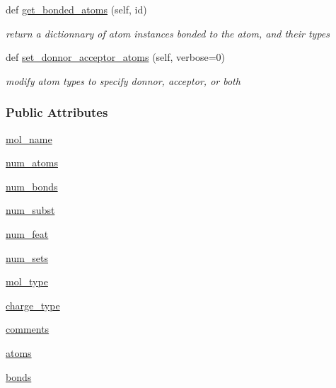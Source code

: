 \begin{DoxyCompactItemize}
def \hyperlink{classsrc_1_1Mol2_1_1mol2_a85de5060effdb6a854a5cad7f511bf30}{get\+\_\+bonded\+\_\+atoms} (self, id)
\begin{DoxyCompactList}\small\item\em return a dictionnary of atom instances bonded to the atom, and their types \end{DoxyCompactList}\item 
def \hyperlink{classsrc_1_1Mol2_1_1mol2_ab5b30e2c2ee6ff7c9d05870341722dea}{set\+\_\+donnor\+\_\+acceptor\+\_\+atoms} (self, verbose=0)
\begin{DoxyCompactList}\small\item\em modify atom types to specify donnor, acceptor, or both \end{DoxyCompactList}\end{DoxyCompactItemize}
\subsubsection*{Public Attributes}
\begin{DoxyCompactItemize}
\item 
\hyperlink{classsrc_1_1Mol2_1_1mol2_aedcbab63ca041f50457a2fb89c3c972b}{mol\+\_\+name}
\item 
\hyperlink{classsrc_1_1Mol2_1_1mol2_a59f5f0db5c54ee3d283dc7f5f7516ad9}{num\+\_\+atoms}
\item 
\hyperlink{classsrc_1_1Mol2_1_1mol2_a7cda1518d6b086f18bdbe38358bf64e0}{num\+\_\+bonds}
\item 
\hyperlink{classsrc_1_1Mol2_1_1mol2_acb2006979cf623c41bb9bc71231a8146}{num\+\_\+subst}
\item 
\hyperlink{classsrc_1_1Mol2_1_1mol2_a19373b7e59f74f0e860812f7955c9784}{num\+\_\+feat}
\item 
\hyperlink{classsrc_1_1Mol2_1_1mol2_a9c7d152a22bdb35dba0663ab3ad7b647}{num\+\_\+sets}
\item 
\hyperlink{classsrc_1_1Mol2_1_1mol2_ad21515ebc6a8aab1bff8bc37568dbb8e}{mol\+\_\+type}
\item 
\hyperlink{classsrc_1_1Mol2_1_1mol2_a458a296ca9f8b7b690bf2c26d0488772}{charge\+\_\+type}
\item 
\hyperlink{classsrc_1_1Mol2_1_1mol2_a0e2c0755c1f2849f40bc6b18cbc400ee}{comments}
\item 
\hyperlink{classsrc_1_1Mol2_1_1mol2_a09aaa9a674c219d57217d8fa49121d87}{atoms}
\item 
\hyperlink{classsrc_1_1Mol2_1_1mol2_a1064b4873e03aedd9e639c97dc147f9f}{bonds}
\end{DoxyCompactItemize}


